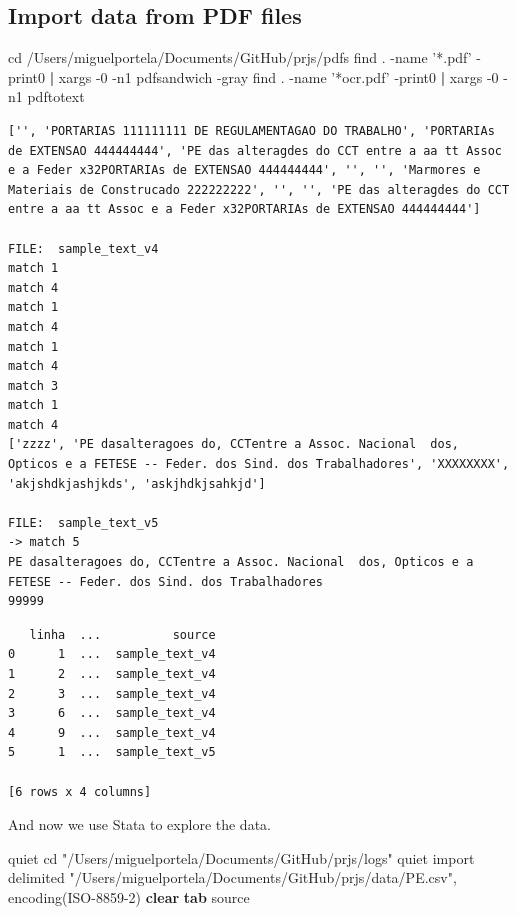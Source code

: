 \documentclass[
  12pt,
]{article}
\newenvironment{Shaded}{\begin{snugshade}}{\end{snugshade}}
\newcommand{\BuiltInTok}[1]{#1}
\newcommand{\FunctionTok}[1]{\textcolor[rgb]{0.00,0.00,0.00}{#1}}
\newcommand{\KeywordTok}[1]{\textcolor[rgb]{0.13,0.29,0.53}{\textbf{#1}}}
\newcommand{\NormalTok}[1]{#1}
\newcommand{\StringTok}[1]{\textcolor[rgb]{0.31,0.60,0.02}{#1}}
\begin{document}
\vspace{0.3cm}

\hypertarget{import-data-from-pdf-files}{%
\subsection{Import data from PDF files}\label{import-data-from-pdf-files}}

\begin{Shaded}
\begin{Highlighting}[]
  \BuiltInTok{cd}\NormalTok{ /Users/miguelportela/Documents/GitHub/prjs/pdfs}
    \FunctionTok{find}\NormalTok{ . -name }\StringTok{'*.pdf'}\NormalTok{ -print0 }\KeywordTok{|} \FunctionTok{xargs}\NormalTok{ -0 -n1 pdfsandwich -gray}
    \FunctionTok{find}\NormalTok{ . -name }\StringTok{'*ocr.pdf'}\NormalTok{ -print0 }\KeywordTok{|} \FunctionTok{xargs}\NormalTok{ -0 -n1 pdftotext}
\end{Highlighting}
\end{Shaded}

\begin{verbatim}
['', 'PORTARIAS 111111111 DE REGULAMENTAGAO DO TRABALHO', 'PORTARIAs de EXTENSAO 444444444', 'PE das alteragdes do CCT entre a aa tt Assoc e a Feder x32PORTARIAs de EXTENSAO 444444444', '', '', 'Marmores e Materiais de Construcado 222222222', '', '', 'PE das alteragdes do CCT entre a aa tt Assoc e a Feder x32PORTARIAs de EXTENSAO 444444444']
   
FILE:  sample_text_v4
match 1
match 4
match 1
match 4
match 1
match 4
match 3
match 1
match 4
['zzzz', 'PE dasalteragoes do, CCTentre a Assoc. Nacional  dos, Opticos e a FETESE -- Feder. dos Sind. dos Trabalhadores', 'XXXXXXXX', 'akjshdkjashjkds', 'askjhdkjsahkjd']
   
FILE:  sample_text_v5
-> match 5
PE dasalteragoes do, CCTentre a Assoc. Nacional  dos, Opticos e a FETESE -- Feder. dos Sind. dos Trabalhadores
99999
\end{verbatim}

\begin{verbatim}
   linha  ...          source
0      1  ...  sample_text_v4
1      2  ...  sample_text_v4
2      3  ...  sample_text_v4
3      6  ...  sample_text_v4
4      9  ...  sample_text_v4
5      1  ...  sample_text_v5

[6 rows x 4 columns]
\end{verbatim}

And now we use Stata to explore the data.

\begin{Shaded}
\begin{Highlighting}[]

\NormalTok{quiet cd }\StringTok{"/Users/miguelportela/Documents/GitHub/prjs/logs"}
\NormalTok{quiet import delimited }\StringTok{"/Users/miguelportela/Documents/GitHub/prjs/data/PE.csv"}\NormalTok{, encoding(ISO-8859-2) }\KeywordTok{clear}
\KeywordTok{tab}\NormalTok{ source}
\end{Highlighting}
\end{Shaded}
\end{document}
